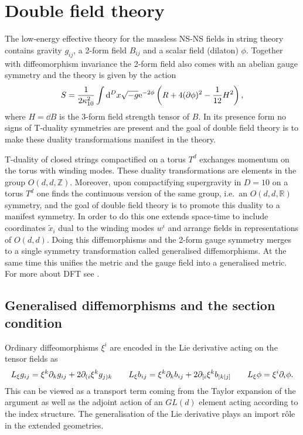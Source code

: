 \chapter{Double field theory}\label{sec:DFT}
The low-energy effective theory for the massless NS-NS fields in string theory contains gravity $g_{ij}$, a 2-form field $B_{ij}$ and a scalar field (dilaton) $\phi$. Together with diffeomorphism invariance the 2-form field also comes with an abelian gauge symmetry and the theory is given by the action 
\begin{equation}
    S = \frac{1}{2\kappa_{10}^2}\int \mathrm{d} ^Dx \sqrt{-g}\mathrm{e}^{-2\phi}\left(R+4(\partial\phi)^2-\frac{1}{12}H^2\right),
\end{equation}
where $H=\dd B$ is the 3-form field strength tensor of $B$. In its presence form no signs of T-duality symmetries are present and the goal of double field theory is to make these duality transformations manifest in the theory.

T-duality of closed strings compactified on a torus $T^d$ exchanges momentum on the torus with winding modes. These duality transformations are elements in the group $O(d,d,\mathbb{Z})$. Moreover, upon compactifying supergravity in $D=10$ on a torus $T^d$ one finds the continuous version of the same group, i.e.\ an $O(d,d,\mathbb{R})$ symmetry, and the goal of double field theory is to promote this duality to a manifest symmetry. In order to do this one extends space-time to include coordinates $\tilde{x}_i$ dual to the winding modes $w^i$ and arrange fields in representations of $O(d,d)$. Doing this diffemorphisms and the 2-form gauge symmetry merges to a single symmetry transformation called generalised diffemorphisms. At the same time this unifies the metric and the gauge field into a generalised metric. For more about DFT see \cite{Berman2014,HohmZwiebach2013,DFTHullZwiebach2009,DFTAldazabal2013}. 


\section{Generalised diffemorphisms and the section condition}
Ordinary diffeomorphisms $\xi^i$ are encoded in the Lie derivative acting on the tensor fields as 
\begin{equation}
    L_\xi g_{ij} = \xi^k\partial_kg_{ij}+2\partial_{(i}\xi^kg_{j)k} \qquad L_\xi b_{ij} = \xi^k\partial_k b_{ij} + 2 \partial_{[i}\xi^k b_{|k|j]} \qquad L_\xi \phi = \xi^i\partial_i\phi. 
\end{equation}
This can be viewed as a transport term coming from the Taylor expansion of the argument as well as the adjoint action of an $GL(d)$ element acting according to the index structure. The generalisation of the Lie derivative plays an import rôle in the extended geometries. 

